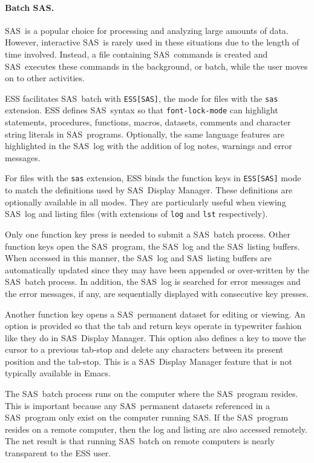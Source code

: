 \documentclass{article}
\newcommand*{\SAS}{\textsc{SAS}}
\newcommand{\stexttt}[1]{{\small\texttt{#1}}}
\begin{document}
\paragraph{Batch \SAS.}
\label{sec:sas-batch}

\SAS\ is a popular choice for processing and analyzing large amounts
of data.  However, interactive \SAS\ is rarely used in these situations
due to the length of time involved.  Instead, a file containing \SAS\
commands is created and \SAS\ executes these commands in the background,
or batch, while the user moves on to other activities.

ESS facilitates \SAS\ batch with \stexttt{ESS[SAS]}, the mode for files
with the \stexttt{sas} extension.  ESS defines \SAS\ syntax so that
\stexttt{font-lock-mode} can highlight statements, procedures,
functions, macros, datasets, comments and character string literals in
\SAS\ programs.  Optionally, the same language features are
highlighted in the \SAS\ log with the addition of log notes, warnings
and error messages.

For files with the \stexttt{sas} extension, ESS binds the function
keys in \stexttt{ESS[SAS]} mode to match the definitions used by \SAS\
Display Manager.  These definitions are optionally available in all
modes.  They are particularly useful when viewing \SAS\ log and
listing files (with extensions of \stexttt{log} and \stexttt{lst}
respectively).

Only one function key press is needed to submit a \SAS\ batch process.
Other function keys open the \SAS\ program, the \SAS\ log and the
\SAS\ listing buffers.  When accessed in this manner, the \SAS\ log
and \SAS\ listing buffers are automatically updated since they may
have been appended or over-written by the \SAS\ batch process.  In
addition, the \SAS\ log is searched for error messages and the error
messages, if any, are sequentially displayed with consecutive key
presses.

Another function key opens a \SAS\ permanent dataset for editing or
viewing.  An option is provided so that the tab and return keys
operate in typewriter fashion like they do in \SAS\ Display Manager.
This option also defines a key to move the cursor to a previous
tab-stop and delete any characters between its present position and
the tab-stop.  This is a \SAS\ Display Manager feature that is not
typically available in Emacs.

The \SAS\ batch process runs on the computer where the \SAS\ program
resides.  This is important because any \SAS\ permanent datasets
referenced in a \SAS\ program only exist on the computer running \SAS.
If the \SAS\ program resides on a remote computer, then the
log and listing are also accessed remotely.  The net result is that
running \SAS\ batch on remote computers is nearly transparent to the
ESS user.
\end{document}
